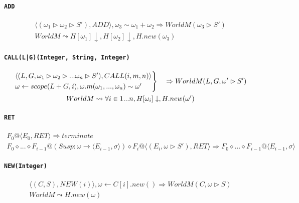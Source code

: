 \documentclass[]{article}
\numberwithin{equation}{section}
\numberwithin{figure}{section}
\numberwithin{table}{section}
\begin{document}
\paragraph{\texttt{ADD}}\label{add}

\begin{gather*}
  \langle (\omega_1 \rhd \omega_2 \rhd S'), ADD\rangle, \omega_3 \sim \omega_1 + \omega_2 \Rightarrow WorldM (\omega_3 \rhd S')\\
  WorldM \leadsto H[\omega_1] \downarrow, H[\omega_2] \downarrow, H.new(\omega_3)
\end{gather*}

\paragraph{\texttt{CALL(L|G)(Integer, String, Integer)}}\label{callinteger-string-integer}

\begin{gather*}
  \begin{rcases}
    \langle (L, G, \omega_1 \rhd \omega_2 \rhd ... \omega_n \rhd S'), CALL(i, m, n)\rangle\\
    \omega \leftarrow scope(L + G, i), \omega.m(\omega_1, ..., \omega_n) \sim \omega'
  \end{rcases}
  \quad
    \Rightarrow WorldM (L, G, \omega' \rhd S' )\\
  WorldM \leadsto \forall i \in 1...n, H[\omega_i] \downarrow, H.new(\omega')
\end{gather*}

\paragraph{\texttt{RET}}\label{ret}

\begin{gather*}
  F_0@\langle E_0, RET\rangle \Rightarrow terminate \\
  F_0 \diamond ... \diamond F_{i - 1}@(Susp: \omega \rightarrow \langle E_{i-1}, \sigma \rangle)\diamond F_i@\langle (E_i, \omega \rhd S'), RET\rangle \Rightarrow F_0 \diamond ... \diamond F_{i-1}@ \langle E_{i-1}, \sigma \rangle
\end{gather*}

\paragraph{\texttt{NEW(Integer)}}\label{newinteger}

\begin{gather*}
  \langle (C, S), NEW(i)\rangle, \omega \leftarrow C[i].new() \Rightarrow WorldM (C, \omega \rhd S)\\
  WorldM \leadsto H.new(\omega)
\end{gather*}
\end{document}
